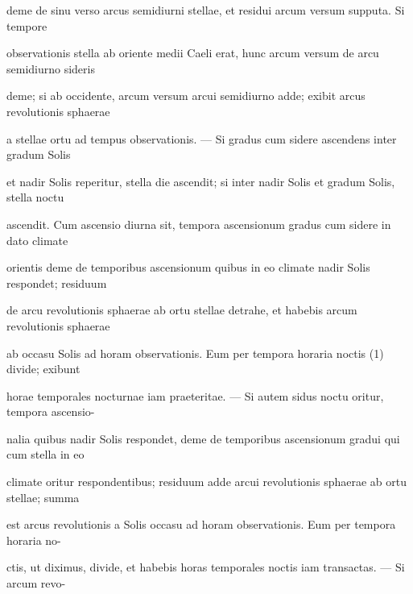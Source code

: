 \documentclass[11pt]{article}
\begin{document}
\noindent\hypertarget{AB01-PDF0123-body-L006}{}deme de sinu verso arcus semidiurni stellae, et residui arcum versum supputa. Si tempore\strut\par
\noindent\hypertarget{AB01-PDF0123-body-L007}{}observationis stella ab oriente medii Caeli erat, hunc arcum versum de arcu semidiurno sideris\strut\par
\noindent\hypertarget{AB01-PDF0123-body-L008}{}deme; si ab occidente, arcum versum arcui semidiurno adde; exibit arcus revolutionis sphaerae\strut\par
\noindent\hypertarget{AB01-PDF0123-body-L009}{}a stellae ortu ad tempus observationis. — Si gradus cum sidere ascendens inter gradum Solis\strut\par
\noindent\hypertarget{AB01-PDF0123-body-L010}{}et nadir Solis reperitur, stella die ascendit; si inter nadir Solis et gradum Solis, stella noctu\strut\par
\noindent\hypertarget{AB01-PDF0123-body-L011}{}ascendit. Cum ascensio diurna sit, tempora ascensionum gradus cum sidere in dato climate\strut\par
\noindent\hypertarget{AB01-PDF0123-body-L012}{}orientis deme de temporibus ascensionum quibus in eo climate nadir Solis respondet; residuum\strut\par
\noindent\hypertarget{AB01-PDF0123-body-L013}{}de arcu revolutionis sphaerae ab ortu stellae detrahe, et habebis arcum revolutionis sphaerae\strut\par
\noindent\hypertarget{AB01-PDF0123-body-L014}{}ab occasu Solis ad horam observationis. Eum per tempora horaria noctis (1) divide; exibunt\strut\par
\noindent\hypertarget{AB01-PDF0123-body-L015}{}horae temporales nocturnae iam praeteritae. — Si autem sidus noctu oritur, tempora ascensio-\strut\par
\noindent\hypertarget{AB01-PDF0123-body-L016}{}nalia quibus nadir Solis respondet, deme de temporibus ascensionum gradui qui cum stella in eo\strut\par
\noindent\hypertarget{AB01-PDF0123-body-L017}{}climate oritur respondentibus; residuum adde arcui revolutionis sphaerae ab ortu stellae; summa\strut\par
\noindent\hypertarget{AB01-PDF0123-body-L018}{}est arcus revolutionis a Solis occasu ad horam observationis. Eum per tempora horaria no-\strut\par
\noindent\hypertarget{AB01-PDF0123-body-L019}{}ctis, ut diximus, divide, et habebis horas temporales noctis iam transactas. — Si arcum revo-\strut\par
\end{document}
